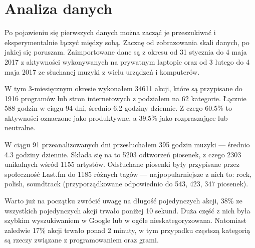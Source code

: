 \documentclass[openright]{xmgr}
\begin{document}
\chapter{Analiza danych}

	Po pojawieniu się pierwszych danych można zacząć je przeszukiwać i eksperymentalnie łączyć między sobą.
	Zacznę od zobrazowania skali danych, po jakiej się poruszam.
	Zaimportowane dane są z okresu od 31 stycznia do 4 maja 2017 z aktywności wykonywanych na prywatnym laptopie
	oraz od 3 lutego do 4 maja 2017 ze słuchanej muzyki z wielu urządzeń i komputerów.

	W tym 3-miesięcznym okresie wykonałem 34611 akcji, które są przypisane do 1916 programów lub stron internetowych z podziałem na 62 kategorie.
	Łącznie 588 godzin w ciągu 94 dni, średnio 6.2 godziny dziennie.
	Z czego 60.5\% to aktywności oznaczone jako produktywne, a 39.5\% jako rozpraszające lub neutralne.

	W ciągu 91 przeanalizowanych dni przesłuchałem 395 godzin muzyki — średnio 4.3 godziny dziennie.
	Składa się na to 5203 odtworzeń piosenek, z czego 2303 unikalnych wśród 1155 artystów.
	Odsłuchane piosenki były przypisane przez społeczność Last.fm do 1185 różnych tagów — najpopularniejsze z nich to: rock, polish, soundtrack
	(przyporządkowane odpowiednio do 543, 423, 347 piosenek).

	Warto już na początku zwrócić uwagę na długość pojedynczych akcji, 38\% ze wszystkich pojedynczych akcji trwało poniżej 10 sekund.
	Duża część z nich była szybkim wyszukiwaniem w Google lub w ogóle nieskategoryzowana.
	Natomiast zaledwie 17\% akcji trwało ponad 2 minuty, w tym przypadku częstszą kategorią są rzeczy związane z programowaniem oraz grami.
\end{document}
